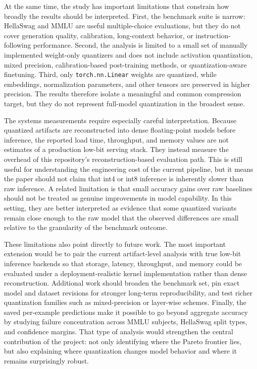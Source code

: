 \documentclass[11pt,twocolumn]{article}
\begin{document}
At the same time, the study has important limitations that constrain how broadly the results should be interpreted. First, the benchmark suite is narrow: HellaSwag and MMLU are useful multiple-choice evaluations, but they do not cover generation quality, calibration, long-context behavior, or instruction-following performance. Second, the analysis is limited to a small set of manually implemented weight-only quantizers and does not include activation quantization, mixed precision, calibration-based post-training methods, or quantization-aware finetuning. Third, only \texttt{torch.nn.Linear} weights are quantized, while embeddings, normalization parameters, and other tensors are preserved in higher precision. The results therefore isolate a meaningful and common compression target, but they do not represent full-model quantization in the broadest sense.

The systems measurements require especially careful interpretation. Because quantized artifacts are reconstructed into dense floating-point models before inference, the reported load time, throughput, and memory values are not estimates of a production low-bit serving stack. They instead measure the overhead of this repository's reconstruction-based evaluation path. This is still useful for understanding the engineering cost of the current pipeline, but it means the paper should not claim that int4 or int8 inference is inherently slower than raw inference. A related limitation is that small accuracy gains over raw baselines should not be treated as genuine improvements in model capability. In this setting, they are better interpreted as evidence that some quantized variants remain close enough to the raw model that the observed differences are small relative to the granularity of the benchmark outcome.

These limitations also point directly to future work. The most important extension would be to pair the current artifact-level analysis with true low-bit inference backends so that storage, latency, throughput, and memory could be evaluated under a deployment-realistic kernel implementation rather than dense reconstruction. Additional work should broaden the benchmark set, pin exact model and dataset revisions for stronger long-term reproducibility, and test richer quantization families such as mixed-precision or layer-wise schemes. Finally, the saved per-example predictions make it possible to go beyond aggregate accuracy by studying failure concentration across MMLU subjects, HellaSwag split types, and confidence margins. That type of analysis would strengthen the central contribution of the project: not only identifying where the Pareto frontier lies, but also explaining where quantization changes model behavior and where it remains surprisingly robust.
\end{document}
